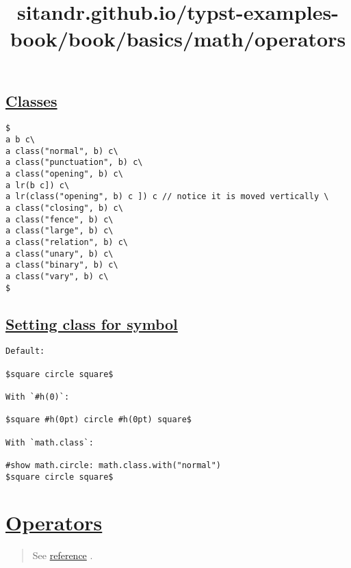 \subsection{\texorpdfstring{\hyperref[classes-1]{Classes}}{Classes}}\label{classes-1}

\begin{verbatim}
$
a b c\
a class("normal", b) c\
a class("punctuation", b) c\
a class("opening", b) c\
a lr(b c]) c\
a lr(class("opening", b) c ]) c // notice it is moved vertically \
a class("closing", b) c\
a class("fence", b) c\
a class("large", b) c\
a class("relation", b) c\
a class("unary", b) c\
a class("binary", b) c\
a class("vary", b) c\
$
\end{verbatim}

\pandocbounded{}

\subsection{\texorpdfstring{\hyperref[setting-class-for-symbol]{Setting
class for
symbol}}{Setting class for symbol}}\label{setting-class-for-symbol}

\begin{verbatim}
Default:

$square circle square$

With `#h(0)`:

$square #h(0pt) circle #h(0pt) square$

With `math.class`:

#show math.circle: math.class.with("normal")
$square circle square$
\end{verbatim}

\pandocbounded{}


\title{sitandr.github.io/typst-examples-book/book/basics/math/operators}

\section{\texorpdfstring{\hyperref[operators]{Operators}}{Operators}}\label{operators}

\begin{quote}
See \href{https://typst.app/docs/reference/math/op/}{reference} .
\end{quote}

